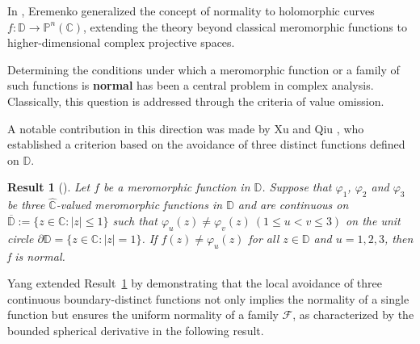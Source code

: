 \documentclass[11pt, reqno]{amsart}
\newtheorem{Result}[theorem]{Result}
\theoremstyle{definition}
\theoremstyle{remark}
\numberwithin{equation}{section}
\begin{document}
In \cite{ere-nhcfprtps-2007}, Eremenko generalized the concept of normality 
to holomorphic curves $f: \mathbb{D} \to \mathbb{P}^n(\mathbb{C})$, 
extending the theory beyond classical meromorphic functions to 
higher-dimensional complex projective spaces. 
\smallskip


Determining the conditions under which a meromorphic function or a 
family of such functions is {\bf normal} has been a central problem 
in complex analysis. Classically, this question is addressed 
through the criteria of value omission.
\smallskip

A notable contribution in this direction was made by Xu and Qiu \cite{qiu-aacfnf-2011}, who established a criterion based on 
the avoidance of three distinct functions defined on $\mathbb D$.

\begin{Result}[{\cite[Theorem 1]{qiu-aacfnf-2011}}] \label{R-Xu_Qiu_AC} 
Let $f$ be a meromorphic function in $\mathbb{D}$. Suppose that $\varphi_1$, $\varphi_2$ and $\varphi_3$ be three 
$\widehat{\mathbb C}$-valued meromorphic functions in $\mathbb D$ 
and are continuous on $\overline{\mathbb{D}}:=
\{z\in\mathbb C:|z|\leq1\}$ such that 
$\varphi_u(z) \neq \varphi_v(z)\ (1 \leq u < v \leq 3)$ 
on the unit circle $\partial\mathbb D=\{z\in\mathbb C:|z|=1\}$. 
If $f(z)\neq\varphi_u(z)$ for all $z\in\mathbb{D}$ and $u=1,2,3$, 
then f is normal.
\end{Result}

Yang \cite{yang-anotacfnf-2020} extended Result~\ref{R-Xu_Qiu_AC} by demonstrating that the 
local avoidance of three continuous boundary-distinct functions not 
only implies the normality of a single function but ensures the 
uniform normality of a family $\mathcal{F}$, as characterized by 
the bounded spherical derivative in the following result.
\end{document}
